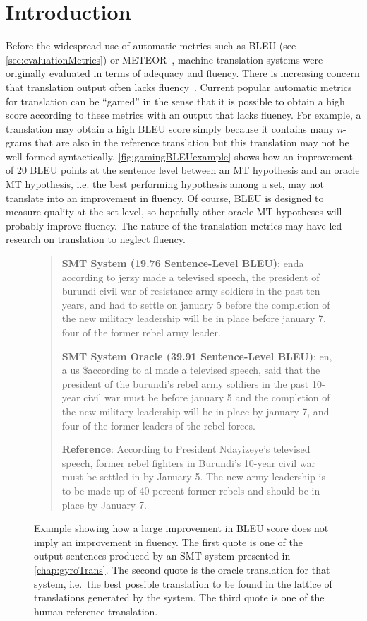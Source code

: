 
\section{Introduction}

Before the widespread use of automatic metrics such as
BLEU (see \autoref{sec:evaluationMetrics}) or
METEOR~\citep{banerjee-lavie:2005:MTSumm}, machine translation
systems were originally evaluated in terms of adequacy
and fluency.
There is increasing concern that translation output
often lacks fluency~\citep{knight:2007:TALK}.
Current popular automatic metrics for translation can be ``gamed'' in the
sense that it is possible to obtain a high score according to these
metrics with an output that lacks fluency.
For example, a translation may obtain a high BLEU score simply
because it contains many $n$-grams that are also in the reference
translation but this translation may not be well-formed syntactically.
\autoref{fig:gamingBLEUexample} shows how an improvement of
20 BLEU points at the sentence level between an MT hypothesis
and an oracle MT hypothesis, i.e. the best performing hypothesis among a set, may
not translate into
an improvement in fluency. Of course, BLEU is designed to
measure quality at the set level, so hopefully other oracle MT
hypotheses will probably improve fluency.
The nature of the translation metrics may have led research on translation to neglect fluency.
%
\begin{figure}
\begin{quote}
  \textbf{SMT System (19.76 Sentence-Level BLEU)}: enda according to jerzy made a televised speech, the president of burundi civil war of resistance army soldiers in the past ten years, and had to settle on january 5 before the completion of the new military leadership will be in place before january 7, four of the former rebel army leader.

  \textbf{SMT System Oracle (39.91 Sentence-Level BLEU)}: en, a us \$according to al made a televised speech, said that the president of the burundi's rebel army soldiers in the past 10-year civil war must be before january 5 and the completion of the new military leadership will be in place by january 7, and four of the former leaders of the rebel forces.

  \textbf{Reference}: According to President Ndayizeye's televised speech, former rebel fighters in Burundi's 10-year civil war must be settled in by January 5.  The new army leadership is to be made up of 40 percent former rebels and should be in place by January 7.
\end{quote}
\caption{Example showing how a large improvement in BLEU score does not imply an improvement in fluency.
  The first quote is one of the output sentences produced by an SMT system presented in \autoref{chap:gyroTrans}.
  The second quote is the oracle translation for that system, i.e.\ the best possible translation to be found
  in the lattice of translations generated by the system. The third quote is one of the human reference translation.}
\label{fig:gamingBLEUexample}
\end{figure}

